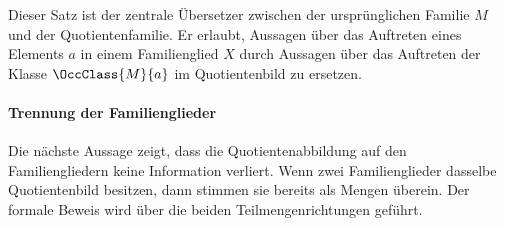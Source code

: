 \documentclass[main.tex]{subfiles}
\begin{document}
\begin{tabproofsplitwide}
  \closeproofpartwide
\end{tabproofsplitwide}

Dieser Satz ist der zentrale Übersetzer zwischen der ursprünglichen Familie
\(M\) und der Quotientenfamilie. Er erlaubt, Aussagen über das Auftreten eines
Elements \(a\) in einem Familienglied \(X\) durch Aussagen über das Auftreten
der Klasse \(\OccClass{M}{a}\) im Quotientenbild zu ersetzen.

\paragraph{Trennung der Familienglieder}

Die nächste Aussage zeigt, dass die Quotientenabbildung auf den
Familiengliedern keine Information verliert. Wenn zwei Familienglieder dasselbe
Quotientenbild besitzen, dann stimmen sie bereits als Mengen überein. Der
formale Beweis wird über die beiden Teilmengenrichtungen geführt.
\end{document}
